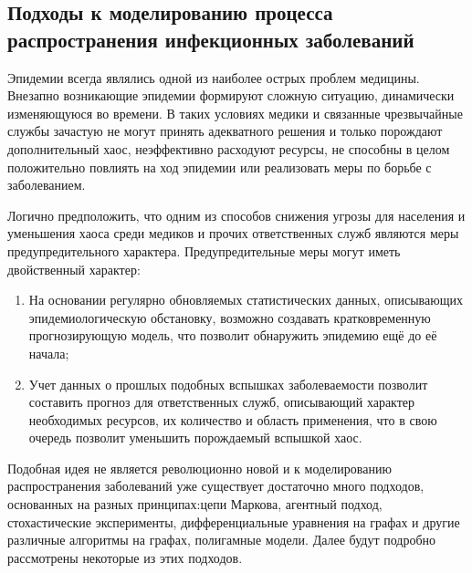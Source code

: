 \newpage
\parindent=1cm %
\begin{center}
		
		\section{Подходы к моделированию процесса распространения инфекционных заболеваний}
		
\end{center}

Эпидемии всегда являлись одной из наиболее острых проблем медицины. Внезапно возникающие эпидемии формируют сложную ситуацию, динамически изменяющуюся во времени. В таких условиях медики и связанные чрезвычайные службы зачастую не могут принять адекватного решения и только порождают дополнительный хаос, неэффективно расходуют ресурсы, не способны в целом положительно повлиять на ход эпидемии или реализовать меры по борьбе с заболеванием. 


Логично предположить, что одним из способов снижения угрозы для населения и уменьшения хаоса среди медиков и прочих ответственных служб являются меры предупредительного характера. Предупредительные меры могут иметь двойственный характер: 
\begin{enumerate}
	\item На основании регулярно обновляемых статистических данных, описывающих эпидемиологическую обстановку, возможно создавать кратковременную прогнозирующую модель, что позволит обнаружить эпидемию ещё до её начала;
	\item Учет данных о прошлых подобных вспышках заболеваемости позволит составить прогноз для ответственных служб, описывающий характер необходимых ресурсов, их количество и область применения, что в свою очередь позволит уменьшить порождаемый вспышкой хаос.
\end{enumerate}

Подобная идея не является революционно новой и  к моделированию распространения заболеваний уже  существует  достаточно много подходов, основанных на разных принципах:цепи Маркова, агентный подход, стохастические эксперименты, дифференциальные уравнения на графах и другие  различные алгоритмы на графах, полигамные модели. Далее будут подробно рассмотрены некоторые из этих подходов.

